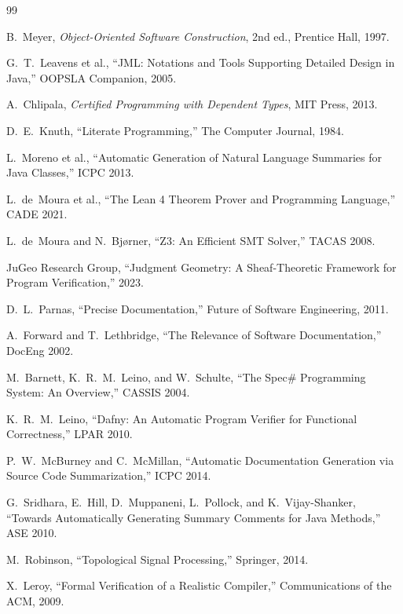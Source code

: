 \documentclass[11pt]{article}
\begin{document}
\begin{thebibliography}{99}

B.~Meyer, \emph{Object-Oriented Software Construction}, 2nd ed.,
Prentice Hall, 1997.

G.~T.~Leavens et al., ``JML: Notations and Tools Supporting Detailed Design in Java,'' OOPSLA Companion, 2005.

A.~Chlipala, \emph{Certified Programming with Dependent Types}, MIT
Press, 2013.

D.~E.~Knuth, ``Literate Programming,'' The Computer Journal, 1984.

L.~Moreno et al., ``Automatic Generation of Natural Language Summaries for Java Classes,'' ICPC 2013.

L.~de~Moura et al., ``The Lean 4 Theorem Prover and Programming Language,'' CADE 2021.

L.~de~Moura and N.~Bjørner, ``Z3: An Efficient SMT Solver,''
TACAS 2008.

JuGeo Research Group, ``Judgment Geometry: A Sheaf-Theoretic Framework for Program Verification,'' 2023.

D.~L.~Parnas, ``Precise Documentation,'' Future of Software Engineering, 2011.

A.~Forward and T.~Lethbridge, ``The Relevance of Software Documentation,'' DocEng 2002.

M.~Barnett, K.~R.~M.~Leino, and W.~Schulte, ``The Spec\# Programming System: An Overview,'' CASSIS 2004.

K.~R.~M.~Leino, ``Dafny: An Automatic Program Verifier for Functional Correctness,'' LPAR 2010.

P.~W.~McBurney and C.~McMillan, ``Automatic Documentation Generation via Source Code Summarization,'' ICPC 2014.

G.~Sridhara, E.~Hill, D.~Muppaneni, L.~Pollock, and K.~Vijay-Shanker, ``Towards Automatically Generating Summary Comments for Java Methods,'' ASE 2010.

M.~Robinson, ``Topological Signal Processing,'' Springer, 2014.

X.~Leroy, ``Formal Verification of a Realistic Compiler,'' Communications of the ACM, 2009.

\end{thebibliography}
\end{document}
